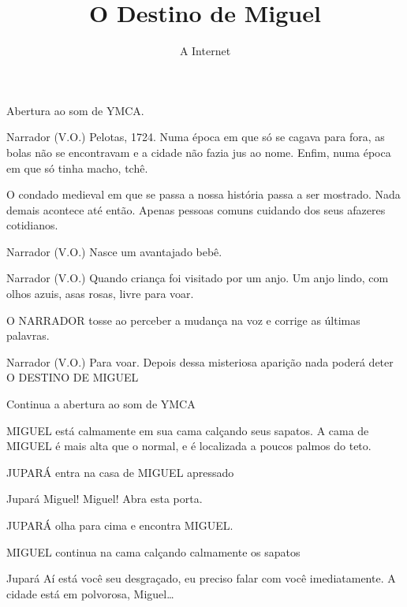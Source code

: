 \documentclass{screenplay}
\title{O Destino de Miguel}
\author{A Internet}
\begin{document}
\coverpage
\fadein

Abertura ao som de YMCA.

\begin{dialogue}{Narrador (V.O.)}
    Pelotas, 1724. Numa época em que só se cagava para fora, as bolas não se encontravam e a cidade não fazia jus ao nome. Enfim, numa época em que só tinha macho, tchê.
\end{dialogue}

O condado medieval em que se passa a nossa história passa a ser mostrado. Nada demais acontece até então. Apenas pessoas comuns cuidando dos seus afazeres cotidianos.

\begin{dialogue}{Narrador (V.O.)}
    Nasce um avantajado bebê.
\end{dialogue}

\begin{dialogue}{Narrador (V.O.)}
    Quando criança foi visitado por um anjo. Um anjo lindo, com olhos azuis, asas rosas, livre para voar.
\end{dialogue}

O NARRADOR tosse ao perceber a mudança na voz e corrige as últimas palavras.

\begin{dialogue}{Narrador (V.O.)}
    Para voar.
    Depois dessa misteriosa aparição nada poderá deter O DESTINO DE MIGUEL
\end{dialogue}

Continua a abertura ao som de YMCA


MIGUEL está calmamente em sua cama calçando seus sapatos.
A cama de MIGUEL é mais alta que o normal, e é localizada a poucos palmos do teto.

JUPARÁ entra na casa de MIGUEL apressado

\begin{dialogue}{Jupará}
    Miguel! Miguel! Abra esta porta.
\end{dialogue}

JUPARÁ olha para cima e encontra MIGUEL.

MIGUEL continua na cama calçando calmamente os sapatos

\begin{dialogue}{Jupará}
    Aí está você seu desgraçado, eu preciso falar com você imediatamente.
    A cidade está em polvorosa, Miguel\ldots
\end{dialogue}
\end{document}
